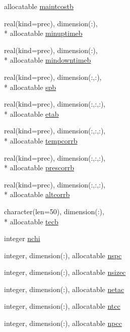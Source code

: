 \begin{DoxyCompactItemize}
allocatable \hyperlink{classinputvar_ac52f743f02f10e96c455d94c3cdc0fe8}{maintcostb}
\item 
real(kind=prec), dimension(\-:), \\*
allocatable \hyperlink{classinputvar_a699644b9b98282661cd55dc10d96dbcb}{minuptimeb}
\item 
real(kind=prec), dimension(\-:), \\*
allocatable \hyperlink{classinputvar_ae93da8603e9899963da53596705b1d98}{mindowntimeb}
\item 
real(kind=prec), dimension(\-:,\-:), \\*
allocatable \hyperlink{classinputvar_acd5ae0efcfc5e54e9c73d085132bcf5a}{spb}
\item 
real(kind=prec), dimension(\-:,\-:,\-:), \\*
allocatable \hyperlink{classinputvar_adba062c6d3ce600124e2cd8943f7c6e6}{etab}
\item 
real(kind=prec), dimension(\-:,\-:,\-:), \\*
allocatable \hyperlink{classinputvar_a4270f23d875d4a85d7bd5d6699205d03}{tempcorrb}
\item 
real(kind=prec), dimension(\-:,\-:,\-:), \\*
allocatable \hyperlink{classinputvar_a4de979203fa5e65fe0cbfd77c60654ae}{prescorrb}
\item 
real(kind=prec), dimension(\-:,\-:,\-:), \\*
allocatable \hyperlink{classinputvar_a3fb49f59a3c5a2a19350be6bea0d69c2}{altcorrb}
\item 
character(len=50), dimension(\-:), \\*
allocatable \hyperlink{classinputvar_ab2486a625a1ff1aaf70cb9e38d8c07db}{tecb}
\item 
integer \hyperlink{classinputvar_ac34eff504af528e971c7174dfcb39028}{nchi}
\item 
integer, dimension(\-:), allocatable \hyperlink{classinputvar_aad6ce13b0378ba79e193cb3738e2d938}{nspc}
\item 
integer, dimension(\-:), allocatable \hyperlink{classinputvar_af28da5ec88564638bee476f2a37f5308}{nsizec}
\item 
integer, dimension(\-:), allocatable \hyperlink{classinputvar_ad9998f4f97f100bf6294fb8fa083bfe7}{netac}
\item 
integer, dimension(\-:), allocatable \hyperlink{classinputvar_aaf3cc67ce289abacf61f20f5fdcfc3f6}{ntcc}
\item 
integer, dimension(\-:), allocatable \hyperlink{classinputvar_a78f4d80d45d564c96dd9101258656f66}{npcc}

\end{DoxyCompactItemize}
